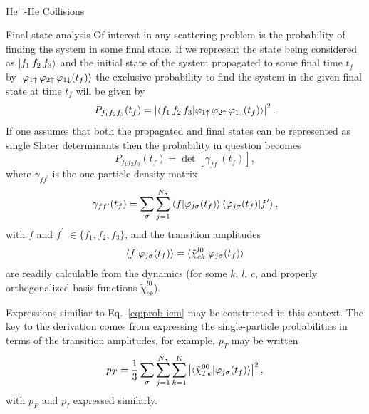 \documentclass[letterpaper, 11 pt]{report}
\begin{document}
\begin{chapter}{\texorpdfstring{He\textsuperscript{+}}{He+}-He Collisions \label{chap:hephe}}
\begin{section}{Final-state analysis \label{sec:hephe-det}}
      Of interest in any scattering problem is the probability of finding the system in some final state.
      If we represent the state being considered as $\ket{f_1 \, f_2 \, f_3}$ and the initial state of
      the system propagated to some final time $t_f$ by $\ket{\varphi_{1 \uparrow} \,
      \varphi_{2 \uparrow} \, \varphi_{1 \downarrow} (t_f)}$ the exclusive probability to find the
      system in the given final state at time $t_f$ will be given by
      \begin{equation} \label{eq:finalProb}
         P_{f_1 f_2 f_3}(t_f) = \left| \braket{ f_1 \, f_2 \, f_3 | \varphi_{1 \uparrow} \,
                                       \varphi_{2 \uparrow} \, \varphi_{1 \downarrow} (t_f) } \right|^2.
      \end{equation}
      If one assumes that both the propagated and final states can be represented as single Slater
      determinants then the probability in question becomes
      \begin{equation} \label{eq:detProb}
         P_{f_1 f_2 f_3}(t_f) = \det \left[ \gamma_{f f^\prime}(t_f) \right],
      \end{equation}
      where $\gamma_{f f^\prime}$ is the one-particle density matrix
      \begin{equation} \label{eq:denmat}
         \gamma_{f f^\prime}(t_f) = \sum\limits_{\sigma} \sum\limits_{j = 1}^{N_\sigma}
                               \braket{f | \varphi_{j \sigma}(t_f)}
                               \braket{\varphi_{j \sigma}(t_f) | f^\prime},
      \end{equation}
      with $f$ and $f^\prime$ $\in \{f_1, f_2, f_3\}$, and the transition amplitudes
      \begin{equation}
         \braket{f | \varphi_{j \sigma}(t_f)}
         = \braket{\tilde{\chi}^{l0}_{c k} | \varphi_{j \sigma}(t_f)}
      \end{equation}
      are readily calculable from the dynamics (for some $k$, $l$, $c$, and properly orthogonalized basis
      functions $\tilde{\chi}^{l0}_{c k}$).

      Expressions similiar to Eq.~\eqref{eq:prob-iem} may be constructed in this
      context. The key to the derivation comes from expressing the single-particle probabilities in
      terms of the transition amplitudes, for example, $p_T$ may be written
      \begin{equation} \label{eq:ptTrans}
         p_T = \frac{1}{3} \sum\limits_{\sigma} \sum\limits_{j = 1}^{N_\sigma} \sum\limits_{k = 1}^{K}
               \left| \braket{ \tilde{\chi}^{00}_{T k} | \varphi_{j \sigma}(t_f)}\right|^2,
      \end{equation}
      with $p_P$ and $p_I$ expressed similarly.


\end{section}
\end{chapter}
\end{document}
